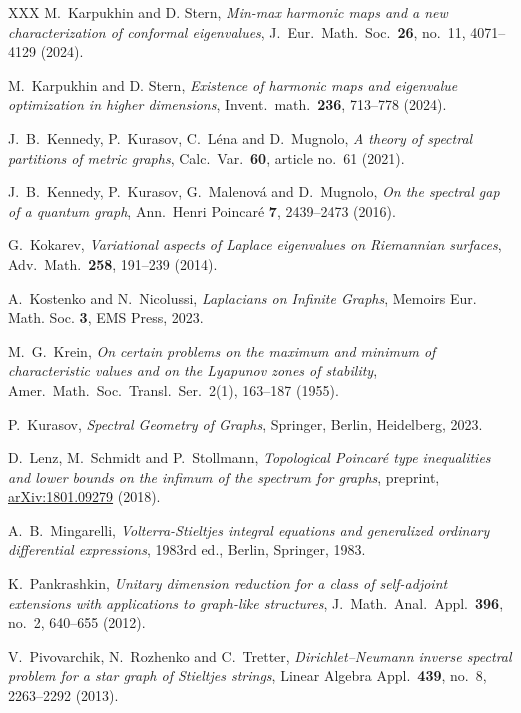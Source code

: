 \documentclass[reqno]{amsart}
\newcommand{\arxiv}[1]{\href{http://arxiv.org/abs/#1}{arXiv:#1}}
\theoremstyle{plain}
\theoremstyle{definition}
\theoremstyle{remark}
\numberwithin{equation}{section}
\begin{document}
\begin{thebibliography}{XXX}
	M.\ Karpukhin and D. Stern, {\em Min-max harmonic maps and a new characterization of conformal eigenvalues}, J.\ Eur.\ Math.\ Soc.\ \textbf{26}, no.~11, 4071--4129 (2024).
	
	M.\ Karpukhin and D. Stern, {\em Existence of harmonic maps and eigenvalue optimization in higher dimensions}, Invent.\ math.\ \textbf{236}, 713--778 (2024).
	
	
	
	J.\ B.\ Kennedy, P.\ Kurasov, C.\ Léna and D.\ Mugnolo, {\em A theory of spectral partitions of metric graphs}, Calc.\ Var.\ \textbf{60}, article no.~61 (2021).	
	
	
	J.\ B.\ Kennedy, P.\ Kurasov, G.\ Malenová and D.\ Mugnolo, {\em On the spectral gap of a quantum
	graph}, Ann.\ Henri Poincaré \textbf{7}, 2439--2473 (2016).
	
	
	G.\ Kokarev, {\em Variational aspects of Laplace eigenvalues on Riemannian surfaces}, Adv.\ Math.\ \textbf{258}, 191--239 (2014).
	
	
	
	A.\ Kostenko and N.\ Nicolussi, {\em Laplacians on Infinite Graphs}, Memoirs Eur. Math. Soc. \textbf{3}, EMS Press, 2023.
	
	
	M.\ G.\ Krein, {\em On certain problems on the maximum and minimum of characteristic values and on the Lyapunov zones of stability}, Amer.\ Math.\ Soc.\ Transl.\ Ser.\ 2(1), 163--187 (1955).
	
	
	P.\ Kurasov, {\em Spectral Geometry of Graphs}, Springer, Berlin, Heidelberg, 2023.
	
	D.\ Lenz, M.\ Schmidt and P.\ Stollmann, {\em Topological Poincaré type inequalities and lower bounds on the infimum of the spectrum for graphs}, preprint, \arxiv{1801.09279} (2018).
	
	
	A.\ B.\ Mingarelli, {\em Volterra-Stieltjes integral equations and generalized ordinary differential expressions}, 1983rd ed., Berlin, Springer, 1983.
	
	K.\ Pankrashkin, {\em Unitary dimension reduction for a class of self-adjoint extensions with applications to graph-like structures}, J.\ Math.\ Anal.\ Appl.\ \textbf{396}, no.~2, 640--655 (2012).
	
	V.\ Pivovarchik, N.\ Rozhenko and C.\ Tretter, {\em Dirichlet–Neumann inverse spectral problem for a star graph of Stieltjes strings}, Linear Algebra Appl.\ \textbf{439}, no.~8, 2263--2292 (2013).
	

\end{thebibliography}
\end{document}

